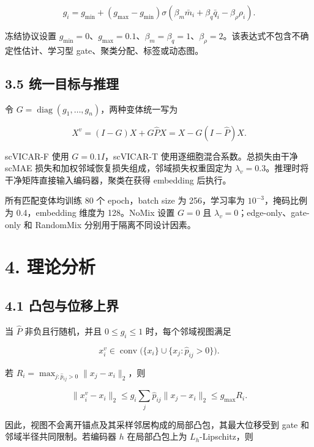 \documentclass[journal]{IEEEtran}
\begin{document}
\begin{equation}
g_i=g_{\min}+(g_{\max}-g_{\min})
\sigma(\beta_m\bar m_i+\beta_q\bar q_i-\beta_\rho\rho_i).
\end{equation}

冻结协议设置 $g_{\min}=0$、$g_{\max}=0.1$、$\beta_m=\beta_q=1$、$\beta_\rho=2$。该表达式不包含不确定性估计、学习型 gate、聚类分配、标签或动态图。

\subsection{3.5 统一目标与推理}

令 $G=\operatorname{diag}(g_1,\ldots,g_n)$，两种变体统一写为

\begin{equation}
X^v=(I-G)X+G\widehat PX=X-G(I-\widehat P)X.
\end{equation}

scVICAR-F 使用 $G=0.1I$，scVICAR-T 使用逐细胞混合系数。总损失由干净 scMAE 损失和加权邻域恢复损失组成，邻域损失权重固定为 $\lambda_v=0.3$。推理时将干净矩阵直接输入编码器，聚类在获得 embedding 后执行。

所有匹配变体均训练 80 个 epoch，batch size 为 256，学习率为 $10^{-3}$，掩码比例为 0.4，embedding 维度为 128。NoMix 设置 $G=0$ 且 $\lambda_v=0$；edge-only、gate-only 和 RandomMix 分别用于隔离不同设计因素。

\section{4. 理论分析}

\subsection{4.1 凸包与位移上界}

当 $\widehat P$ 非负且行随机，并且 $0\le g_i\le1$ 时，每个邻域视图满足

\begin{equation}
x_i^v\in\operatorname{conv}\bigl(\{x_i\}\cup\{x_j:\widehat p_{ij}>0\}\bigr).
\end{equation}

若 $R_i=\max_{j:\widehat p_{ij}>0}\|x_j-x_i\|_2$，则

\begin{equation}
\|x_i^v-x_i\|_2\le g_i\sum_j\widehat p_{ij}\|x_j-x_i\|_2
\le g_{\max}R_i.
\end{equation}

因此，视图不会离开锚点及其采样邻居构成的局部凸包，其最大位移受到 gate 和邻域半径共同限制。若编码器 $h$ 在局部凸包上为 $L_h$-Lipschitz，则
\end{document}
